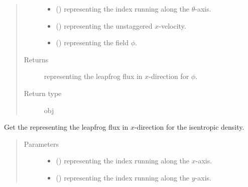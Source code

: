 \documentclass[letterpaper,10pt,english]{sphinxmanual}
\begin{document}
\begin{fulllineitems}
\begin{fulllineitems}
\begin{quote}
\begin{description}
\begin{itemize}
\item {} 
 () \textendash{}  representing the index running along the \(\theta\)-axis.

\item {} 
 () \textendash{}  representing the unstaggered \(x\)-velocity.

\item {} 
 () \textendash{}  representing the field \(\phi\).

\end{itemize}

\item[{Returns}] \leavevmode
{} representing the leapfrog flux in \(x\)-direction for \(\phi\).

\item[{Return type}] \leavevmode
obj

\end{description}\end{quote}

\end{fulllineitems}


\begin{fulllineitems}
\label{\detokenize{api:dycore.flux_isentropic.FluxIsentropicLeapfrog._get_leapfrog_flux_x_density}}
Get the  representing the leapfrog flux in \(x\)-direction for the isentropic density.
\begin{quote}\begin{description}
\item[{Parameters}] \leavevmode\begin{itemize}
\item {} 
 () \textendash{}  representing the index running along the \(x\)-axis.

\item {} 
 () \textendash{}  representing the index running along the \(y\)-axis.


\end{itemize}
\end{description}
\end{quote}
\end{fulllineitems}
\end{fulllineitems}
\end{document}
